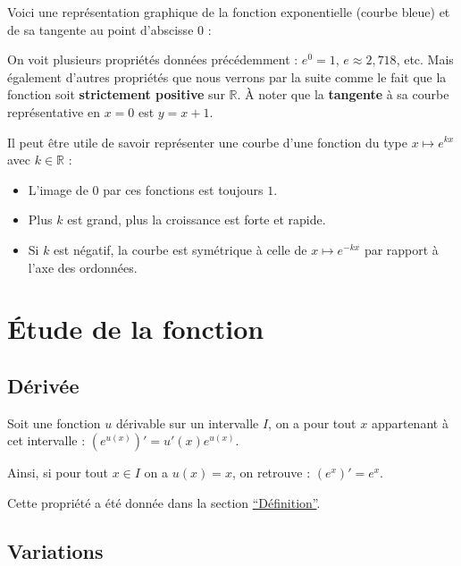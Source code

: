 	Voici une représentation graphique de la fonction exponentielle (courbe bleue) et de sa tangente au point d'abscisse $0$ :
	
	
	On voit plusieurs propriétés données précédemment : $e^0 = 1$, $e \approx 2,718$, etc. Mais également d'autres propriétés que nous verrons par la suite comme le fait que la fonction soit \textbf{strictement positive} sur $\mathbb{R}$. À noter que la \textbf{tangente} à sa courbe représentative en $x = 0$ est $y = x + 1$.
	
	\begin{tip}
		Il peut être utile de savoir représenter une courbe d'une fonction du type $x \mapsto e^{kx}$ avec $k \in \mathbb{R}$ :
		\begin{itemize}
			\item L'image de $0$ par ces fonctions est toujours $1$.
			\item Plus $k$ est grand, plus la croissance est forte et rapide.
			\item Si $k$ est négatif, la courbe est symétrique à celle de $x \mapsto e^{-kx}$ par rapport à l'axe des ordonnées.
		\end{itemize}
	\end{tip}
	
	\section{Étude de la fonction}
	
	\subsection{Dérivée}
	
	\begin{formula}
		Soit une fonction $u$ dérivable sur un intervalle $I$, on a pour tout $x$ appartenant à cet intervalle : $(e^{u(x)})' = u'(x)e^{u(x)}$.
	\end{formula}
	
	\begin{formula}[Dérivée]
		Ainsi, si pour tout $x \in I$ on a $u(x) = x$, on retrouve : $({e^x})' = e^x$.
	\end{formula}
	
	Cette propriété a été donnée dans la section \hyperref[definition]{``Définition''}.
	
	\subsection{Variations}
	
